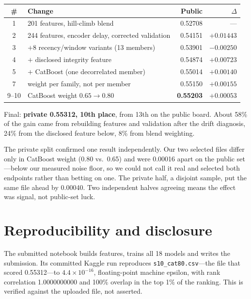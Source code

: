 \documentclass[10pt,a4paper]{article}
\begin{document}
\begin{center}\small
\begin{tabular}{@{}clrr@{}}
\toprule
\# & Change & Public & $\Delta$ \\
\midrule
1  & 201 features, hill-climb blend                     & 0.52708 & --- \\
2  & 244 features, encoder delay, corrected validation  & 0.54151 & $+0.01443$ \\
3  & $+$8 recency/window variants (13 members)          & 0.53901 & $-0.00250$ \\
4  & $+$ disclosed integrity feature                    & 0.54874 & $+0.00723$ \\
5  & $+$ CatBoost (one decorrelated member)             & 0.55014 & $+0.00140$ \\
7  & weight per family, not per member                  & 0.55150 & $+0.00155$ \\
9--10 & CatBoost weight $0.65 \rightarrow 0.80$         & \textbf{0.55203} & $+0.00053$ \\
\bottomrule
\end{tabular}
\end{center}

\vspace{-3pt}
Final: \textbf{private 0.55312, 10th place}, from 13th on the public board. About
58\% of the gain came from rebuilding features and validation after the drift
diagnosis, 24\% from the disclosed feature below, 8\% from blend weighting.

The private split confirmed one result independently. Our two selected files
differ only in CatBoost weight (0.80 vs.\ 0.65) and were 0.00016 apart on the
public set---below our measured noise floor, so we could not call it real and
selected both endpoints rather than betting on one. The private half, a disjoint
sample, put the same file ahead by 0.00040. Two independent halves agreeing means
the effect was signal, not public-set luck.

\section{Reproducibility and disclosure}

The submitted notebook builds features, trains all 18 models and writes the
submission. Its committed Kaggle run reproduces \texttt{s10\_cat80.csv}---the
file that scored 0.55312---to $4.4\times10^{-16}$, floating-point machine
epsilon, with rank correlation 1.0000000000 and 100\% overlap in the top 1\% of
the ranking. This is verified against the uploaded file, not asserted.
\end{document}

